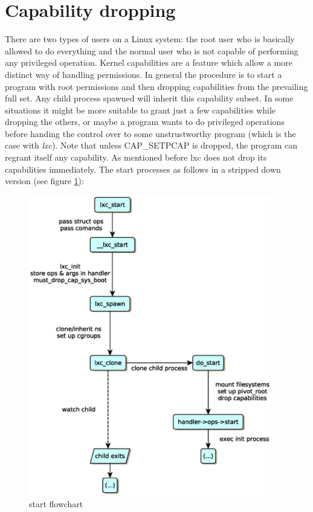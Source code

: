 \section{Capability dropping}\label{caps}

There are two types of users on a Linux system: the root user who is basically allowed to do everything and the normal user 
who is not capable of performing any privileged operation. Kernel capabilities are a feature which allow a more distinct way of handling
permissions. In general the procedure is to start a program with root permissions and then dropping capabilities from the prevailing full set.
Any child process spawned will inherit this capability subset.
In some situations it might be more suitable to grant just a few capabilities while dropping the others, or maybe a program wants to do
privileged operations before handing the control over to some unstrustworthy program (which is the case with \textit{lxc}). Note
that unless CAP\_SETPCAP is dropped, the program can regrant itself any capability\cite{kernelcaps}.
As mentioned before lxc does not drop its capabilities immediately. The start processes as follows in a stripped down version (see figure \ref{figure_1}):\\
\begin{figure}[htb]
\begin{center}
  \includegraphics[width=300pt]{fig/figure_1.eps}
  \caption{start flowchart}
  \label{figure_1}
\end{center}
\end{figure}
